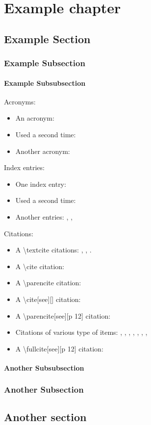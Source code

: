 \chapter{Example chapter}

\minitoc[n] %

\section{Example Section}

\subsection{Example Subsection}

\subsubsection{Example Subsubsection}

Acronyms:
\begin{itemize}
  \item An acronym: \acro
  \item Used a second time: \acro
  \item Another acronym: \yaacro
\end{itemize}

Index entries:
\begin{itemize}
  \item One index entry: \entry
  \item Used a second time: \entry
  \item Another entries: \yaentry, \snentry, \smentry
\end{itemize}

Citations: 
\begin{itemize}
  \item A \textbackslash{}textcite citations: \textcite{test2010}, \textcite{test2013}, \textcite{test2011}.
  \item A \textbackslash{}cite citation: \cite{test2013}
  \item A \textbackslash{}parencite citation: \parencite{test2013}
  \item A \textbackslash{}cite[see][] citation: \cite[see][]{test2013}
  \item A \textbackslash{}parencite[see][p 12] citation: \parencite[see][p 12]{test2013}
  \item Citations of various type of items: 
    \cite{test2010}, \cite{test2013}, \cite{test2011}, \cite{test2011b}, \cite{misc2002},
    \cite{phdthesis1999}, \cite{techreport1995}, \cite{book1998}
  \item A \textbackslash{}fullcite[see][p 12] citation: 
\end{itemize}

\subsubsection{Another Subsubsection}

\subsection{Another Subsection}

\section{Another section}
